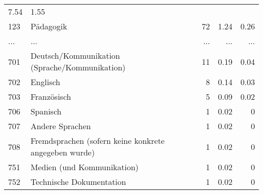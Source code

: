 \begin{longtable}{lXrrr}
          \num[round-mode=places,round-precision=2]{7.54} &
          \num[round-mode=places,round-precision=2]{1.55} \\
        123 & \multicolumn{1}{X}{Pädagogik} & %
          \num{72} &
          \num[round-mode=places,round-precision=2]{1.24} &
          \num[round-mode=places,round-precision=2]{0.26} \\
       ... & ... & ... & ... & ... \\
        701 & \multicolumn{1}{X}{Deutsch/Kommunikation (Sprache/Kommunikation)} & %
          \num{11} &
          \num[round-mode=places,round-precision=2]{0.19} &
          \num[round-mode=places,round-precision=2]{0.04} \\

        702 & \multicolumn{1}{X}{Englisch} & %
          \num{8} &
          \num[round-mode=places,round-precision=2]{0.14} &
          \num[round-mode=places,round-precision=2]{0.03} \\

        703 & \multicolumn{1}{X}{Französisch} & %
          \num{5} &
          \num[round-mode=places,round-precision=2]{0.09} &
          \num[round-mode=places,round-precision=2]{0.02} \\

        706 & \multicolumn{1}{X}{Spanisch} & %
          \num{1} &
          \num[round-mode=places,round-precision=2]{0.02} &
          \num[round-mode=places,round-precision=2]{0} \\

        707 & \multicolumn{1}{X}{Andere Sprachen} & %
          \num{1} &
          \num[round-mode=places,round-precision=2]{0.02} &
          \num[round-mode=places,round-precision=2]{0} \\

        708 & \multicolumn{1}{X}{Fremdsprachen (sofern keine konkrete angegeben wurde)} & %
          \num{1} &
          \num[round-mode=places,round-precision=2]{0.02} &
          \num[round-mode=places,round-precision=2]{0} \\

        751 & \multicolumn{1}{X}{Medien (und Kommunikation)} & %
          \num{1} &
          \num[round-mode=places,round-precision=2]{0.02} &
          \num[round-mode=places,round-precision=2]{0} \\

        752 & \multicolumn{1}{X}{Technische Dokumentation} & %
          \num{1} &
          \num[round-mode=places,round-precision=2]{0.02} &
          \num[round-mode=places,round-precision=2]{0} \\


\end{longtable}
